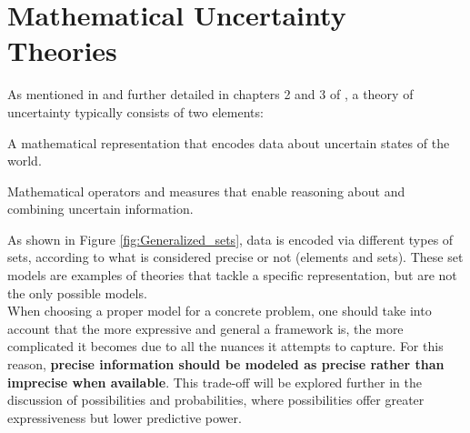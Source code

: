 \section{Mathematical Uncertainty Theories}

As mentioned in \cite{uncertaintymeasuresbigpicture} and further detailed in chapters 2 and 3 of \cite{UncertaintySciences}, a theory of uncertainty typically consists of two elements:

\begin{romanenum}
    \item A mathematical representation that encodes data about uncertain states of the world.
    \item Mathematical operators and measures that enable reasoning about and combining uncertain information.
\end{romanenum}

As shown in Figure \ref{fig:Generalized_sets}, data is encoded via different types of sets, according to what is considered precise or not (elements and sets). These set models are examples of theories that tackle a specific representation, but are not the only possible models.\\

When choosing a proper model for a concrete problem, one should 
take into account that the more expressive and general a framework 
is, the more complicated it becomes due to all the nuances it 
attempts to capture. For this reason, \textbf{precise information should be modeled as precise rather than imprecise when available}. This trade-off will be explored further in the discussion of possibilities and probabilities, where possibilities offer greater expressiveness but lower predictive power.


